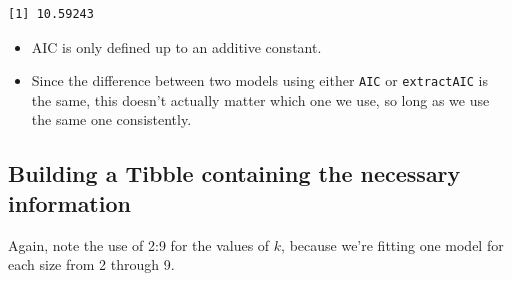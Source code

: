 \documentclass[]{book}
\newenvironment{Shaded}{\begin{snugshade}}{\end{snugshade}}
\newcommand{\KeywordTok}[1]{\textcolor[rgb]{0.13,0.29,0.53}{\textbf{#1}}}
\newcommand{\DataTypeTok}[1]{\textcolor[rgb]{0.13,0.29,0.53}{#1}}
\newcommand{\DecValTok}[1]{\textcolor[rgb]{0.00,0.00,0.81}{#1}}
\newcommand{\StringTok}[1]{\textcolor[rgb]{0.31,0.60,0.02}{#1}}
\newcommand{\OperatorTok}[1]{\textcolor[rgb]{0.81,0.36,0.00}{\textbf{#1}}}
\newcommand{\NormalTok}[1]{#1}
\providecommand{\tightlist}{%
  \setlength{\itemsep}{0pt}\setlength{\parskip}{0pt}}
\theoremstyle{definition}
\theoremstyle{definition}
\theoremstyle{definition}
\theoremstyle{remark}
\begin{document}
\begin{verbatim}
[1] 10.59243
\end{verbatim}

\begin{itemize}
\tightlist
\item
  AIC is only defined up to an additive constant.
\item
  Since the difference between two models using either \texttt{AIC} or
  \texttt{extractAIC} is the same, this doesn't actually matter which
  one we use, so long as we use the same one consistently.
\end{itemize}

\subsection{Building a Tibble containing the necessary
information}\label{building-a-tibble-containing-the-necessary-information}

Again, note the use of 2:9 for the values of \(k\), because we're
fitting one model for each size from 2 through 9.

\begin{Shaded}
\end{Shaded}
\end{document}
